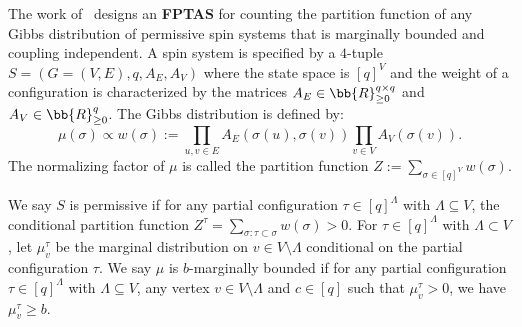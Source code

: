 \documentclass[a4paper,11pt]{article}
\begin{document}
The work of~\cite{CFGZZ24} designs an \textbf{FPTAS} for counting the partition function of any Gibbs distribution of permissive spin systems that is marginally bounded and coupling independent. A spin system is specified by a $4$-tuple $S=(G = (V,E),q, A_E, A_V)$ where the state space is $[q]^V$ and the weight of a configuration is characterized by the matrices $A_E \in \bb{R}_{\geq 0}^{q\times q}$ and $A_V \in \bb{R}_{\geq 0}^q$. The Gibbs distribution is defined by:
\[
\mu(\sigma)\propto w(\sigma):=\prod_{u,v\in E} A_E(\sigma(u),\sigma(v))\prod_{v\in V} A_V(\sigma(v)).
\]
The normalizing factor of $\mu$ is called the partition function $Z:=\sum_{\sigma\in [q]^V}w(\sigma)$.

We say $S$ is permissive if for any partial configuration $\tau \in [q]^\Lambda$ with $\Lambda \subseteq V$, the conditional partition function $Z^\tau = \sum_{\sigma:\tau\subset \sigma} w(\sigma) >0$. For $\tau\in [q]^\Lambda$ with $\Lambda \subset V$, let $\mu_v^\tau$ be the marginal distribution on $v\in V\setminus \Lambda$ conditional on the partial configuration $\tau$. We say $\mu$ is $b$-marginally bounded if for any partial configuration $\tau \in [q]^\Lambda$ with $\Lambda \subseteq V$, any vertex $v \in V\setminus \Lambda$ and $c\in [q]$ such that $\mu_v^\tau>0$, we have $\mu_v^\tau\geq b$.
\end{document}
